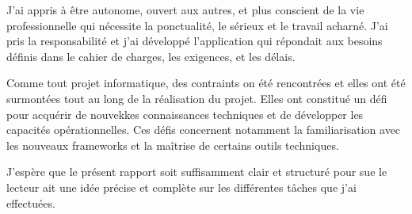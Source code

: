 J'ai appris à être autonome, ouvert aux autres, et plus conscient de la vie professionnelle qui nécessite la ponctualité, le sérieux et le travail acharné. J'ai pris la responsabilité et j'ai développé l'application qui répondait aux besoins définis dans le cahier de charges, les exigences, et les délais.

Comme tout projet informatique, des contraints on été rencontrées et elles ont été surmontées tout au long de la réalisation du projet. Elles ont constitué un défi pour acquérir de nouvekkes connaissances techniques et de développer les capacités opérationnelles. Ces défis concernent notamment la familiarisation avec les nouveaux frameworks et la maîtrise de certains outils techniques.

J'espère que le présent rapport soit suffisamment clair et structuré pour sue le lecteur ait une idée précise et complète sur les différentes tâches que j'ai effectuées.